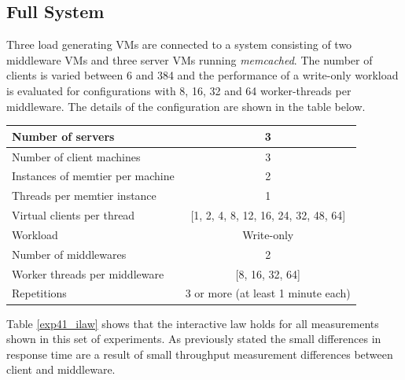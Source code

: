 \documentclass[11pt,a4paper]{article}
\begin{document}
\subsection{Full System}

Three load generating VMs are connected to a system  consisting of two middleware VMs and three server VMs running \emph{memcached}.
The number of clients is varied between 6 and 384 and the performance of a write-only workload is evaluated for configurations with 8, 16, 32 and 64 worker-threads per middleware. The details of the configuration are shown in the table below.


\begin{center}
	\scriptsize{
		\begin{tabular}{|l|c|}
			\hline Number of servers                & 3          \\ 
			\hline Number of client machines        & 3          \\ 
			\hline Instances of memtier per machine & 2          \\ 
			\hline Threads per memtier instance     & 1          \\
			\hline Virtual clients per thread       & [1, 2, 4, 8, 12, 16, 24, 32, 48, 64]    \\ 
			\hline Workload                         & Write-only \\
			\hline Number of middlewares            & 2          \\
			\hline Worker threads per middleware    & [8, 16, 32, 64]    \\
			\hline Repetitions                      & 3 or more (at least 1 minute each)  \\ 
			\hline 
		\end{tabular}
	} 
\end{center}

Table \ref{exp41_ilaw} shows that the interactive law holds for all measurements shown in this set of experiments. As previously stated the small differences in response time are a result of small throughput measurement differences between client and middleware.
\end{document}
